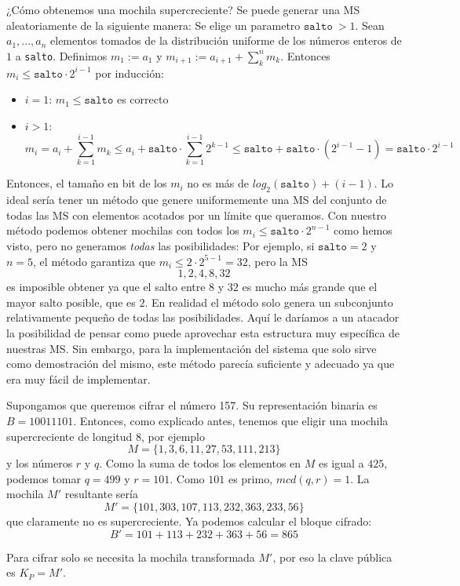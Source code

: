 \documentclass[12pt]{article}
\newenvironment{example}[1][Ejemplo]{\begin{trivlist}
\item[\hskip \labelsep {\bfseries #1}]}{\end{trivlist}}
\begin{document}
¿Cómo obtenemos una mochila supercreciente? Se puede generar una MS aleatoriamente de la siguiente manera: Se elige un parametro $\texttt{salto}\ > 1$. Sean $a_1, ..., a_n$ elementos tomados de la distribución uniforme de los números enteros de $1$ a \texttt{salto}. Definimos $m_1 := a_1$ y $m_{i+1} := a_{i+1} + \sum_k^n m_{k}$. Entonces $m_i \leq \texttt{salto} \cdot 2^{i-1}$ por inducción:
\begin{itemize}
	\item $i = 1$: $m_1 \leq \texttt{salto}$ es correcto
	\item $i > 1$:
	$$m_{i} = a_i + \sum_{k=1}^{i-1} m_{k} \leq a_i + \texttt{salto} \cdot \sum_{k=1}^{i-1}2^{k-1} \leq \texttt{salto} + \texttt{salto} \cdot ( 2^{i-1} - 1) = \texttt{salto} \cdot 2^{i-1}$$
\end{itemize}
Entonces, el tamaño en bit de los $m_i$ no es más de $log_2(\texttt{salto}) + (i-1)$. Lo ideal sería tener un método que genere uniformemente una MS del conjunto de todas las MS con elementos acotados por un límite que queramos. Con nuestro método podemos obtener mochilas con todos los $m_i \leq \texttt{salto} \cdot 2^{n-1}$ como hemos visto, pero no generamos \emph{todas} las posibilidades: Por ejemplo, si $\texttt{salto} = 2$ y $n = 5$, el método garantiza que $m_i \leq 2 \cdot 2^{5-1} = 32$, pero la MS
$$1,2,4,8,32$$
es imposible obtener ya que el salto entre $8$ y $32$ es mucho más grande que el mayor salto posible, que es $2$. En realidad el método solo genera un subconjunto relativamente pequeño de todas las posibilidades. Aquí le daríamos a un atacador la posibilidad de pensar como puede aprovechar esta estructura muy específica de nuestras MS. Sin embargo, para la implementación del sistema que solo sirve como demostración del mismo, este método parecía suficiente y adecuado ya que era muy fácil de implementar.

\begin{example}
Supongamos que queremos cifrar el número 157. Su representación binaria es $B = 10011101$. Entonces, como explicado antes, tenemos que eligir una mochila supercreciente de longitud $8$, por ejemplo
$$M = \{1, 3, 6, 11, 27, 53, 111, 213\}$$
y los números $r$ y $q$. Como la suma de todos los elementos en $M$ es igual a $425$, podemos tomar $q = 499$ y $r = 101$. Como $101$ es primo, $mcd(q,r) = 1$. La mochila $M'$ resultante sería
$$M' = \{101, 303, 107, 113, 232, 363, 233, 56\}$$
que claramente no es supercreciente. Ya podemos calcular el bloque cifrado:
$$B' = 101 + 113 + 232 + 363 + 56 = 865$$
\end{example}
Para cifrar solo se necesita la mochila transformada $M'$, por eso la clave pública es $K_P = M'$.
\end{document}
